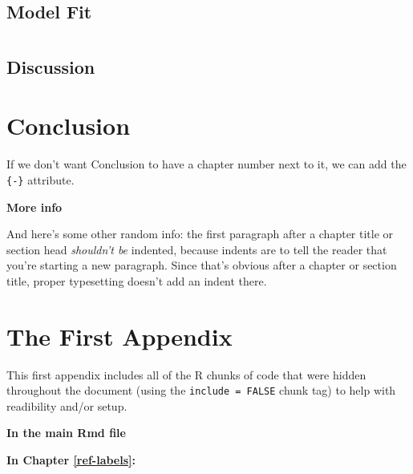 \documentclass[12pt,twoside]{reedthesis}
\theoremstyle{definition}
\theoremstyle{definition}
\theoremstyle{definition}
\theoremstyle{remark}
\begin{document}
\chapter{}\label{section-4}

\section{Model Fit}\label{model-fit}

\chapter{}\label{section-5}

\section{Discussion}\label{discussion}

\chapter*{Conclusion}\label{conclusion}

If we don't want Conclusion to have a chapter number next to it, we can
add the \texttt{\{-\}} attribute.

\textbf{More info}

And here's some other random info: the first paragraph after a chapter
title or section head \emph{shouldn't be} indented, because indents are
to tell the reader that you're starting a new paragraph. Since that's
obvious after a chapter or section title, proper typesetting doesn't add
an indent there.

\appendix

\chapter{The First Appendix}\label{the-first-appendix}

This first appendix includes all of the R chunks of code that were
hidden throughout the document (using the \texttt{include\ =\ FALSE}
chunk tag) to help with readibility and/or setup.

\textbf{In the main Rmd file}
\begin{Shaded}
\begin{Highlighting}[]
\NormalTok{(}\OperatorTok{!}
  \NormalTok{(}\NormalTok{, } \NormalTok{)}
\NormalTok{(}\OperatorTok{!}
\OperatorTok{::}\NormalTok{(}\NormalTok{)}
\end{Highlighting}
\end{Shaded}
\textbf{In Chapter \ref{ref-labels}:}
\end{document}
